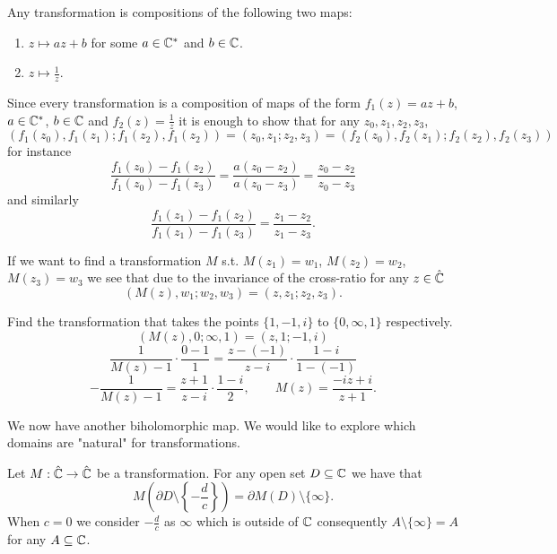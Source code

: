 \documentclass[10pt, a4paper]{article}
\begin{document}
\begin{corollary}
    Any \mobius transformation is compositions of the following two maps:

    \begin{enumerate}[label = (\roman*)]
        \item $z \mapsto az + b$ for some $a \in \mathbb{C} ^ {*}$ and $b \in \mathbb{C}$.

        \item $z \mapsto \frac{1}{z}$.
    \end{enumerate}
\end{corollary}

Since every \mobius transformation is a composition of maps of the form $f_1(z) = az + b$,
$a \in \mathbb{C} ^ {*}$,
$b \in \mathbb{C}$ and $f_2(z) = \frac{1}{z}$ it is enough to show that for any $z_0, z_1, z_2, z_3$,
\[
(f_1(z_0), f_1(z_1); f_1(z_2), f_1(z_2)) = (z_0, z_1; z_2, z_3) = (f_2(z_0), f_2(z_1); f_2(z_2), f_2(z_3))
\]
for instance
\[
\frac{f_1(z_0) - f_1(z_2)}{f_1(z_0) - f_1(z_3)} = \frac{a(z_0 - z_2)}{a(z_0 - z_3)} = \frac{z_0 - z_2}{z_0 - z_3}
\]
and similarly
\[
\frac{f_1(z_1) - f_1(z_2)}{f_1(z_1) - f_1(z_3)} = \frac{z_1 - z_2}{z_1 - z_3}.
\]

If we want to find a \mobius transformation $M$ s.t. $M(z_1) = w_1$,
$M(z_2) = w_2$,
$M(z_3) = w_3$ we see that due to the invariance of the cross-ratio for any $z \in \hat{\mathbb{C}}$
\[
(M(z), w_1; w_2, w_3) = (z, z_1; z_2, z_3).
\]

\begin{example}
    Find the \mobius transformation that takes the points $\{1, -1, i\}$ to $\{0,\infty, 1\}$ respectively.
    \[
    (M(z), 0; \infty, 1) = (z, 1; -1, i)
    \]
    \[
    \frac{1}{M(z) - 1}\cdot\frac{0 - 1}{1} = \frac{z - (-1)}{z - i}\cdot\frac{1 - i}{1 - (-1)}
    \]
    \[
    -\frac{1}{M(z) - 1} = \frac{z + 1}{z - i}\cdot\frac{1 - i}{2},\qquad M(z) = \frac{-iz + i}{z + 1}.
    \]
\end{example}

We now have another biholomorphic map.
We would like to explore which domains are
"natural"
for \mobius transformations.

\begin{lemma}
    Let $M : \hat{\mathbb{C}} \to \hat{\mathbb{C}}$ be a \mobius transformation.
    For any open set $D \subseteq \mathbb{C}$ we have that
    \[
    M\left(\partial D \setminus \left\{-\frac{d}{c}\right\}\right) = \partial M(D) \setminus \{\infty\}.
    \]
    When $c = 0$ we consider $-\frac{d}{c}$ as $\infty$ which is outside of $\mathbb{C}$ consequently $A \setminus \{\infty\} = A$ for any $A \subseteq \mathbb{C}$.
\end{lemma}
\end{document}
